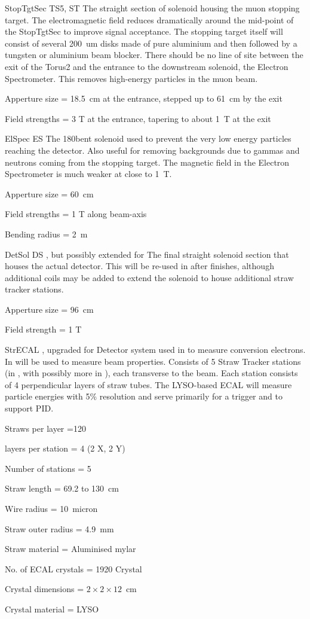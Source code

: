 {StopTgtSec}
{TS5, ST}
{\phaseII}
{The straight section of solenoid housing the muon stopping target.  The electromagnetic field reduces dramatically around the mid-point of the StopTgtSec to improve signal acceptance.  The stopping target itself will consist of several 200~um disks made of pure aluminium and then followed by a tungsten or aluminium beam blocker.  There should be no line of site between the exit of the Torus2 and the entrance to the downstream solenoid, the Electron Spectrometer.  This removes high-energy particles in the muon beam.}
{\item Apperture size = 18.5~cm at the entrance, stepped up to  61~cm by the exit
 \item Field strengths = 3 T at the entrance, tapering to about 1~T at the exit}

{ElSpec}
{ES}
{\phaseII}
{The 180\degree bent solenoid used to prevent the very low energy particles reaching the detector.  Also useful for removing backgrounds due to gammas and neutrons coming from the stopping target.  The magnetic field in the Electron Spectrometer is much weaker at close to 1~T.}
{\item Apperture size = 60~cm
 \item Field strengths = 1 T along beam-axis
 \item Bending radius = 2~m}

{DetSol}
{DS}
{\phaseI, but possibly extended for \phaseII}
{The final straight solenoid section that houses the actual detector.  This will be re-used in \phaseII after \phaseI finishes, although additional coils may be added to extend the solenoid to house additional straw tracker stations.  }
{\item Apperture size = 96~cm
 \item Field strength = 1 T}

{StrECAL}
{}
{\phaseI, upgraded for \phaseII}
{Detector system used in \phaseII to measure conversion electrons.   In \phaseI will be used to measure beam properties.  Consists of 5 Straw Tracker stations (in \phaseI, with possibly more in \phaseII), each transverse to the beam.  Each station consists of 4 perpendicular layers of straw tubes.  The LYSO-based ECAL will measure particle energies with 5\% resolution and serve primarily for a trigger and to support PID.}
{\item Straws per layer =120
 \item layers per station  = 4 (2 X, 2 Y)
 \item Number of stations = 5
 \item Straw length = 69.2 to 130~cm
 \item Wire radius = 10~micron
 \item Straw outer radius = 4.9~mm 
 \item Straw material = Aluminised mylar
 \item No. of ECAL crystals = 1920 Crystal
 \item Crystal dimensions = $2\times2\times12$~cm
 \item Crystal material = LYSO }

